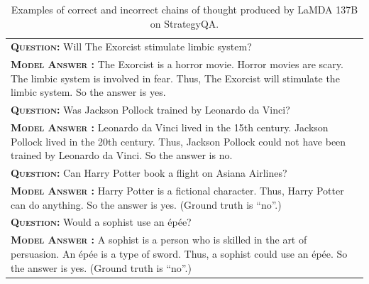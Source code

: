\documentclass[]{article}
\newcommand{\xmark}{\ding{55}}%
\theoremstyle{plain}
\theoremstyle{definition}
\theoremstyle{remark}
\newcommand{\lamda}[0]{LaMDA}
\begin{document}
\endgroup
{}
\begingroup
\begin{table}[h]
    \centering
    \small
    \caption{
    Examples of correct and incorrect chains of thought produced by \lamda{} 137B on StrategyQA.
    }
    \begin{tabular}{p{\linewidth}}
        \toprule
        \vspace{-2mm}
        \textbf{\textsc{Question:}} Will The Exorcist stimulate limbic system? \\
        \vspace{-1mm}
        \textbf{\textsc{Model Answer \color{darkGreen}{(CORRECT)}:}} The Exorcist is a horror movie. Horror movies are scary. The limbic system is involved in fear. Thus, The Exorcist will stimulate the limbic system. So the answer is yes. \color{darkGreen}{\checkmark} \\
        \midrule
        \vspace{-2mm}
        \textbf{\textsc{Question:}} Was Jackson Pollock trained by Leonardo da Vinci? \\
        \vspace{-1mm}
        \textbf{\textsc{Model Answer \color{darkGreen}{(CORRECT)}:}} Leonardo da Vinci lived in the 15th century. Jackson Pollock lived in the 20th century. Thus, Jackson Pollock could not have been trained by Leonardo da Vinci. So the answer is no. \color{darkGreen}{\checkmark} \\
        \midrule
        \vspace{-2mm}
        \textbf{\textsc{Question:}} Can Harry Potter book a flight on Asiana Airlines? \\
        \vspace{-1mm}
        \textbf{\textsc{Model Answer \color{blue}{(INCORRECT)}:}} Harry Potter is a fictional character. {\color{blue} Thus, Harry Potter can do anything.} So the answer is yes. {\color{blue} \xmark{} (Ground truth is ``no''.)} \\
        \midrule
        \vspace{-2mm}
        \textbf{\textsc{Question:}} Would a sophist use an épée? \\
        \vspace{-1mm}
        \textbf{\textsc{Model Answer \color{blue}{(INCORRECT)}:}} A sophist is a person who is skilled in the art of persuasion. An épée is a type of sword. {\color{blue} Thus, a sophist could use an épée.} So the answer is yes. {\color{blue} \xmark{} (Ground truth is ``no''.)} \\
        \bottomrule
    \end{tabular}
    \label{tab:appendix-strategyqa-examples}
\end{table}
\end{document}
